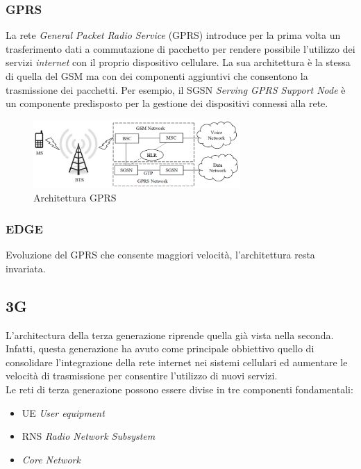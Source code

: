 \clearpage

\subsubsection{GPRS}
La rete \textit{General Packet Radio Service} (GPRS)\cite{gprs-edge} introduce per la prima volta un trasferimento dati a commutazione di pacchetto per rendere 
possibile l'utilizzo dei servizi \textit{internet} con il proprio dispositivo cellulare\cite{gsm-architecture}.
La sua architettura è la stessa di quella del GSM ma con dei componenti aggiuntivi che consentono la trasmissione dei pacchetti. 
Per esempio, il SGSN \textit{Serving GPRS Support Node} è un componente predisposto per la gestione dei dispositivi connessi alla rete.
\begin{figure}[ht]
    \centering
    \includegraphics[width=0.7\textwidth]{images/2g-gprs.png}
    \caption{Architettura GPRS}
\end{figure}
\subsubsection{EDGE}
Evoluzione del GPRS che consente maggiori velocità, l'architettura resta invariata\cite{gprs-edge}.

\clearpage

\subsection{3G}
L'architectura della terza generazione riprende quella già vista nella seconda. Infatti, questa generazione ha avuto come principale obbiettivo 
quello di consolidare l'integrazione della rete internet nei sistemi cellulari ed aumentare le velocità di trasmissione per consentire l'utilizzo 
di nuovi servizi.\\
Le reti di terza generazione possono essere divise in tre componenti fondamentali:
\begin{itemize}
    \item UE \textit{User equipment}
    \item RNS \textit{Radio Network Subsystem}
    \item \textit{Core Network}
\end{itemize}

